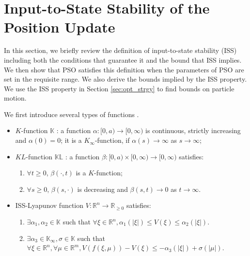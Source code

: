 \section{Input-to-State Stability of the Position Update}
\label{sec:iss}

In this section, we briefly review the definition of input-to-state stability (ISS) including both the conditions that guarantee it and the bound that ISS implies\cite{Jiang2001857}. 
We then show that PSO satisfies this definition when the parameters of PSO are set in the requisite range. We also derive the bounds implied by the ISS property.
We use the ISS property in Section \ref{sec:opt_strgy} to find bounds on particle motion.

We first introduce several types of functions \cite{Jiang2001857}.
\begin{itemize}
\item $ K $-function $ \mathbb{K} $ : a function $ \alpha  : [ 0, a ) \rightarrow [ 0, \infty ) $ is continuous, strictly increasing and $ \alpha (0) = 0 $; it is a $ K_{\infty} $-function, if $ \alpha (s) \rightarrow \infty $ as $ s \rightarrow \infty $;
\item $ KL $-function $ \mathbb{KL} $ : a function $ \beta : [ 0, a ) \times [ 0 , \infty ) \rightarrow [ 0, \infty ) $ satisfies:
\begin{enumerate}
\item $ \forall t \geq 0 $, $ \beta (\cdot , t ) $ is a $ K $-function;
\item $ \forall s \geq 0 $, $ \beta (s, \cdot) $ is decreasing and $ \beta(s,t) \rightarrow 0 $ as $ t \rightarrow \infty $.
\end{enumerate}
\item ISS-Lyapunov function $ V : \mathbb{R}^{n} \rightarrow \mathbb{R}_{\geq 0} $ satisfies:
\begin{enumerate}
\item $ \exists \alpha_{1}, \alpha_{2} \in \mathbb{K} $ such that 
$ \forall \xi \in \mathbb{R}^{n}, \alpha_{1} ( | \xi | ) \leq V( \xi ) \leq \alpha_{2}  ( | \xi | ) $.
\item $ \exists \alpha_{3} \in \mathbb{K}_{\infty} , \sigma \in \mathbb{K} $ such that $ \forall \xi \in \mathbb{R}^{n}, \forall \mu \in \mathbb{R}^{m}, V( f( \xi, \mu ) ) - V( \xi ) \leq - \alpha_{3} ( | \xi | ) + \sigma ( | \mu | ) $. 
\end{enumerate}
\end{itemize}

